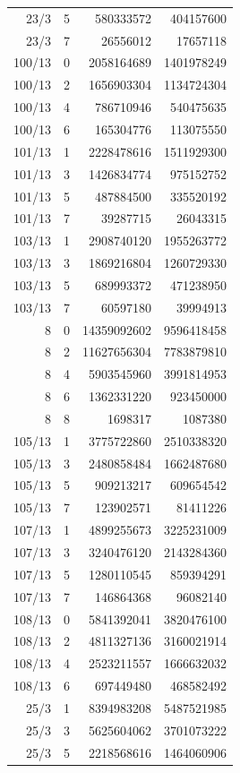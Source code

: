 \begin{longtable}{@{}rrrr@{}}
23/3 & 5 & 580333572 & 404157600\\
23/3 & 7 & 26556012 & 17657118\\
100/13 & 0 & 2058164689 & 1401978249\\
100/13 & 2 & 1656903304 & 1134724304\\
100/13 & 4 & 786710946 & 540475635\\
100/13 & 6 & 165304776 & 113075550\\
101/13 & 1 & 2228478616 & 1511929300\\
101/13 & 3 & 1426834774 & 975152752\\
101/13 & 5 & 487884500 & 335520192\\
101/13 & 7 & 39287715 & 26043315\\
103/13 & 1 & 2908740120 & 1955263772\\
103/13 & 3 & 1869216804 & 1260729330\\
103/13 & 5 & 689993372 & 471238950\\
103/13 & 7 & 60597180 & 39994913\\
8 & 0 & 14359092602 & 9596418458\\
8 & 2 & 11627656304 & 7783879810\\
8 & 4 & 5903545960 & 3991814953\\
8 & 6 & 1362331220 & 923450000\\
8 & 8 & 1698317 & 1087380\\
105/13 & 1 & 3775722860 & 2510338320\\
105/13 & 3 & 2480858484 & 1662487680\\
105/13 & 5 & 909213217 & 609654542\\
105/13 & 7 & 123902571 & 81411226\\
107/13 & 1 & 4899255673 & 3225231009\\
107/13 & 3 & 3240476120 & 2143284360\\
107/13 & 5 & 1280110545 & 859394291\\
107/13 & 7 & 146864368 & 96082140\\
108/13 & 0 & 5841392041 & 3820476100\\
108/13 & 2 & 4811327136 & 3160021914\\
108/13 & 4 & 2523211557 & 1666632032\\
108/13 & 6 & 697449480 & 468582492\\
25/3 & 1 & 8394983208 & 5487521985\\
25/3 & 3 & 5625604062 & 3701073222\\
25/3 & 5 & 2218568616 & 1464060906\\

\end{longtable}
